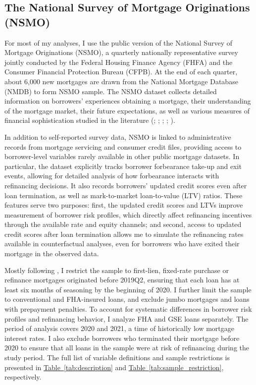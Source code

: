 \documentclass[11pt]{article}
\begin{document}
\subsection{The National Survey of Mortgage Originations (NSMO)}


For most of my analyses, I use the public version of the National Survey of Mortgage Originations (NSMO), a quarterly nationally representative survey jointly conducted by the Federal Housing Finance Agency (FHFA) and the Consumer Financial Protection Bureau (CFPB). At the end of each quarter, about 6,000 new mortgages are drawn from the National Mortgage Database (NMDB) to form NSMO sample. The NSMO dataset collects detailed information on borrowers’ experiences obtaining a mortgage, their understanding of the mortgage market, their future expectations, as well as various measures of financial sophistication studied in the literature (\citet{agarwal2017systematic}; 
\citet{mueller2022increasing}; \citet{jorring2024financial}; \citet{bhutta2024paying};
\citet{tsouderou2025social}).
 
 In addition to self-reported survey data, NSMO is linked to administrative records from mortgage servicing and consumer credit files, providing access to borrower-level variables rarely available in other public mortgage datasets. In particular, the dataset explicitly tracks borrower forbearance take-up and exit events, allowing for detailed analysis of how forbearance interacts with refinancing decisions. It also records borrowers' updated credit scores even after loan termination, as well as mark-to-market loan-to-value (LTV) ratios. These features serve two purposes: first, the updated credit scores and LTVs improve measurement of borrower risk profiles, which directly affect refinancing incentives through the available rate and equity channels; and second, access to updated credit scores after loan termination allows me to simulate the refinancing rates available in counterfactual analyses, even for borrowers who have exited their mortgage in the observed data.



Mostly following \citet{fuster2022predictably}, I restrict the sample to first-lien, fixed-rate purchase or refinance mortgages originated before 2019Q2, ensuring that each loan has at least six months of seasoning by the beginning of 2020. I further limit the sample to conventional and FHA-insured loans, and exclude jumbo mortgages and loans with prepayment penalties. To account for systematic differences in borrower risk profiles and refinancing behavior, I analyze FHA and GSE loans separately. The period of analysis covers 2020 and 2021, a time of historically low mortgage interest rates. I also exclude borrowers who terminated their mortgage before 2020 to ensure that all loans in the sample were at risk of refinancing during the study period. The full list of variable definitions and sample restrictions is presented in \hyperref[tab:description]{Table~\ref*{tab:description}} and \hyperref[tab:sample_restriction]{Table~\ref*{tab:sample_restriction}}, respectively.
\end{document}
